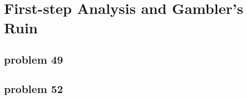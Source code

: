 \section{First-step Analysis and Gambler's Ruin}

\subsection{problem 49}


\subsection{problem 52}
